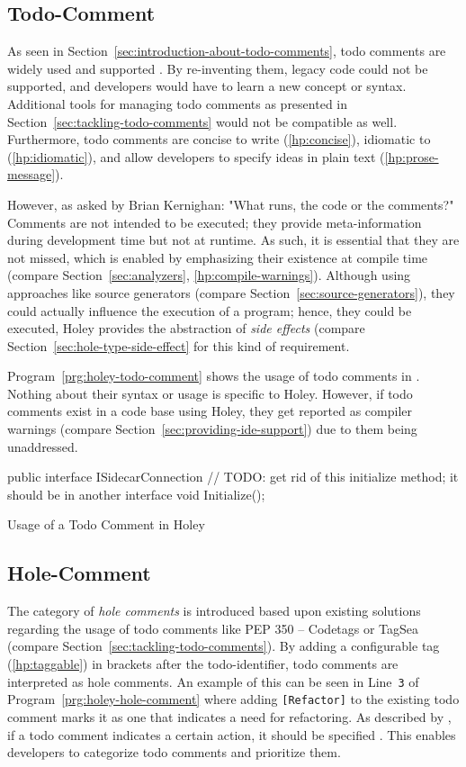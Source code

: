 \subsection{Todo-Comment}
As seen in Section~\ref{sec:introduction-about-todo-comments}, todo comments are widely used and supported \cite{jetbrains_todo_2023}.
By re-inventing them, legacy code could not be supported, and developers would have to learn a new concept or syntax.
Additional tools for managing todo comments as presented in Section~\ref{sec:tackling-todo-comments} would not be compatible as well.
Furthermore, todo comments are concise to write (\ref{hp:concise}), idiomatic to \CS (\ref{hp:idiomatic}), and allow developers to specify ideas in plain text (\ref{hp:prose-message}).

However, as asked by Brian Kernighan: "What runs, the code or the comments?"
Comments are not intended to be executed; they provide meta-information during development time but not at runtime.
As such, it is essential that they are not missed, which is enabled by emphasizing their existence at compile time (compare Section~\ref{sec:analyzers}, \ref{hp:compile-warnings}).
Although using approaches like source generators (compare Section~\ref{sec:source-generators}), they could actually influence the execution of a program; hence, they could be executed, Holey provides the abstraction of \emph{side effects} (compare Section~\ref{sec:hole-type-side-effect} for this kind of requirement.

Program~\ref{prg:holey-todo-comment} shows the usage of todo comments in \CS.
Nothing about their syntax or usage is specific to Holey.
However, if todo comments exist in a code base using Holey, they get reported as compiler warnings (compare Section~\ref{sec:providing-ide-support}) due to them being unaddressed.

\begin{program}[ht]
\begin{CsCode}
public interface ISidecarConnection
{
	// TODO: get rid of this initialize method; it should be in another interface
	void Initialize();
}
\end{CsCode}
\caption{Usage of a Todo Comment in Holey}
\label{prg:holey-todo-comment}
\end{program}

\subsection{Hole-Comment}
The category of \emph{hole comments} is introduced based upon existing solutions regarding the usage of todo comments like PEP 350 -- Codetags or TagSea (compare Section~\ref{sec:tackling-todo-comments}).
By adding a configurable tag (\ref{hp:taggable}) in brackets after the todo-identifier, todo comments are interpreted as hole comments.
An example of this can be seen in Line~\verb|3| of Program~\ref{prg:holey-hole-comment} where adding \verb|[Refactor]| to the existing todo comment marks it as one that indicates a need for refactoring.
As described by \citeauthor{goldin_stop_2022}, if a todo comment indicates a certain action, it should be specified \cite{goldin_stop_2022}.
This enables developers to categorize todo comments and prioritize them.

